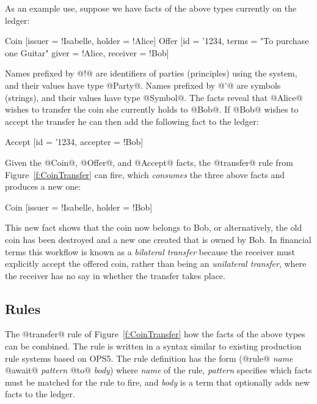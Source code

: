 As an example use, suppose we have facts of the above types currently on the ledger:
\begin{small}
\begin{code}
 Coin   [issuer = !Isabelle, holder = !Alice]
 Offer  [id = '1234, terms = "To purchase one Guitar"
         giver = !Alice, receiver = !Bob]
\end{code}
\end{small}

Names prefixed by @!@ are identifiers of parties (principles) using the system, and their values have type @Party@. Names prefixed by @'@ are symbols (strings), and their values have type @Symbol@. The facts reveal that @Alice@ wishes to transfer the coin she currently holds to @Bob@. If @Bob@ wishes to accept the transfer he can then add the following fact to the ledger:
\begin{small}
\begin{code}
 Accept [id = '1234, accepter = !Bob]
\end{code}
\end{small}

Given the @Coin@, @Offer@, and @Accept@ facts, the @transfer@ rule from Figure~\ref{f:CoinTransfer} can fire, which \emph{consumes} the three above facts and produces a new one:
\begin{small}
\begin{code}
 Coin [issuer = !Isabelle, holder = !Bob]
\end{code}
\end{small}

This new fact shows that the coin now belongs to Bob, or alternatively, the old coin has been destroyed and a new one created that is owned by Bob. In financial terms this workflow is known as a \emph{bilateral transfer} because the receiver must explicitly accept the offered coin, rather than being an \emph{unilateral transfer}, where the receiver has no say in whether the transfer takes place.


\subsection{Rules}
The @transfer@ rule of Figure~\ref{f:CoinTransfer} how the facts of the above types can be combined. The rule is written in a syntax similar to existing production rule systems based on OPS5. The rule definition has the form (@rule@ \emph{name} @await@ \emph{pattern} @to@ \emph{body}) where \emph{name} of the rule, \emph{pattern} specifies which facts must be matched for the rule to fire, and \emph{body} is a term that optionally adds new facts to the ledger.


